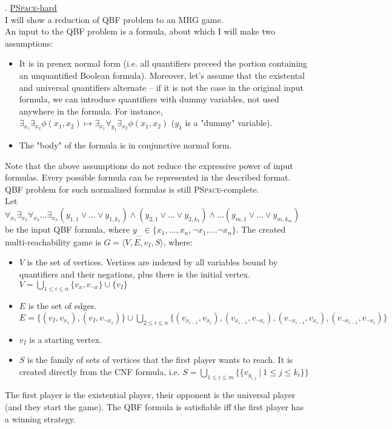 . \underline{\textsc{PSpace}-hard}\\
I will show a reduction of QBF problem to an MRG game.\\
An input to the QBF problem is a formula, about which I will make two assumptions:
\begin{itemize}
    \item It is in prenex normal form (i.e. all quantifiers preceed the portion
    containing an unquantified Boolean formula). Moreover, let's assume that the
    existental and universal quantifiers alternate -- if it is not the case in the
    original input formula, we can introduce quantifiers with dummy variables, not
    used anywhere in the formula. For instance, $\exists_{x_1} \exists_{x_2}
    \phi(x_1, x_2) \mapsto \exists_{x_1} \forall_{y_1} \exists_{x_2} \phi(x_1, x_2)$
    ($y_1$ is a "dummy" variable).
    \item The "body" of the formula is in conjunctive normal form.
\end{itemize}
Note that the above assumptions do not reduce the expressive power of input formulas.
Every possible formula can be represented in the described format. QBF problem for
such normalized formulas is still \textsc{PSpace}-complete.\\
Let $\forall_{x_1} \exists_{x_2} \forall_{x_3} ... \exists_{x_n}
(y_{1,1} \lor ... \lor y_{1,k_1}) \land (y_{2,1} \lor ... \lor y_{2,k_2}) \land ... (y_{m,1} \lor ... \lor y_{m,k_m})$
be the input QBF formula, where $y_{...} \in \{x_1, ..., x_n, \lnot x_1, ... \lnot x_n \}$.
The created multi-reachability game is $G = \langle V, E, v_I, S \rangle$, where:
\begin{itemize}
    \item $V$ is the set of vertices. Vertices are indexed by all variables bound by
          quantifiers and their negations, plus there is the initial vertex.
          $V = \underset{1 \leq i \leq n}{\bigcup} \{v_x, v_{\lnot x}\} \cup \{v_I\}$
    \item $E$ is the set of edges.
          $E = \{(v_I, v_{x_1}), (v_I, v_{\lnot x_1})\} \cup
          \underset{2 \leq i \leq n}{\bigcup} \{ (v_{x_{i-1}}, v_{x_i}), (v_{x_{i-1}}, v_{\lnot x_i}),
          (v_{\lnot x_{i-1}}, v_{x_i}), (v_{\lnot x_{i-1}}, v_{\lnot x_i}) \}$
    \item $v_I$ is a starting vertex.
    \item $S$ is the family of sets of vertices that the first player wants to reach.
          It is created directly from the CNF formula, i.e.
          $S = \underset{1 \leq i \leq m}{\bigcup} \{ \{ v_{y_{i,j}}\ |\ 1 \leq j \leq k_i \} \}$
\end{itemize}
The first player is the existential player, their opponent is the universal player (and they start the game).
The QBF formula is satisfiable iff the first player has a winning strategy.